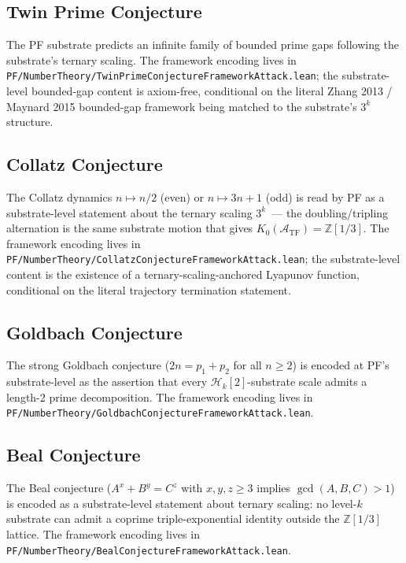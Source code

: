 \documentclass[11pt,a4paper]{article}
\theoremstyle{definition}
\theoremstyle{remark}
\newcommand{\integers}{\mathbb{Z}}
\newcommand{\HilbertK}{\mathcal{H}_{k}}
\newcommand{\TF}{\mathcal{A}_{\mathrm{TF}}}
\newcommand{\lean}[1]{\texttt{\small #1}}
\begin{document}
\subsection{Twin Prime Conjecture}

The PF substrate predicts an infinite family of bounded prime gaps
following the substrate's ternary scaling. The framework
encoding lives in
\lean{PF/NumberTheory/TwinPrimeConjectureFrameworkAttack.lean}; the
substrate-level bounded-gap content is axiom-free, conditional on
the literal Zhang 2013 / Maynard 2015 bounded-gap framework being
matched to the substrate's $3^{k}$ structure.

\subsection{Collatz Conjecture}

The Collatz dynamics $n \mapsto n/2$ (even) or $n \mapsto 3n + 1$
(odd) is read by PF as a substrate-level statement about the
ternary scaling $3^{k}$~--- the doubling/tripling alternation is
the same substrate motion that gives $K_{0}(\TF) = \integers[1/3]$.
The framework encoding lives in
\lean{PF/NumberTheory/CollatzConjectureFrameworkAttack.lean}; the substrate-level
content is the existence of a ternary-scaling-anchored Lyapunov
function, conditional on the literal trajectory termination
statement.

\subsection{Goldbach Conjecture}

The strong Goldbach conjecture ($2n = p_{1} + p_{2}$ for all
$n \ge 2$) is encoded at PF's substrate-level as the assertion
that every $\HilbertK[2]$-substrate scale admits a length-2 prime
decomposition. The framework encoding lives in
\lean{PF/NumberTheory/GoldbachConjectureFrameworkAttack.lean}.

\subsection{Beal Conjecture}

The Beal conjecture ($A^{x} + B^{y} = C^{z}$ with $x, y, z \ge 3$
implies $\gcd(A, B, C) > 1$) is encoded as a substrate-level
statement about ternary scaling: no level-$k$ substrate can admit
a coprime triple-exponential identity outside the
$\integers[1/3]$ lattice. The framework encoding lives in
\lean{PF/NumberTheory/BealConjectureFrameworkAttack.lean}.
\end{document}
